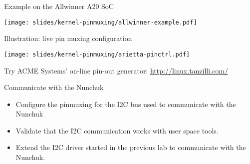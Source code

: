 \begin{frame}[fragile]{Example on the Allwinner A20 SoC}
  \begin{center}
    \texttt{[image: slides/kernel-pinmuxing/allwinner-example.pdf]}
  \end{center}
\end{frame}

\begin{frame}[fragile]{Illustration: live pin muxing configuration}
  \begin{center}
    \texttt{[image: slides/kernel-pinmuxing/arietta-pinctrl.pdf]}
  \end{center}
  Try ACME Systems' on-line pin-out generator: \url{http://linux.tanzilli.com/}
\end{frame}

\setuplabframe
{Communicate with the Nunchuk}
{
  \begin{itemize}
  \item Configure the pinmuxing for the I2C bus used to communicate
    with the Nunchuk
  \item Validate that the I2C communication works with user space
    tools.
  \item Extend the I2C driver started in the previous lab to
    communicate with the Nunchuk.
  \end{itemize}
}
